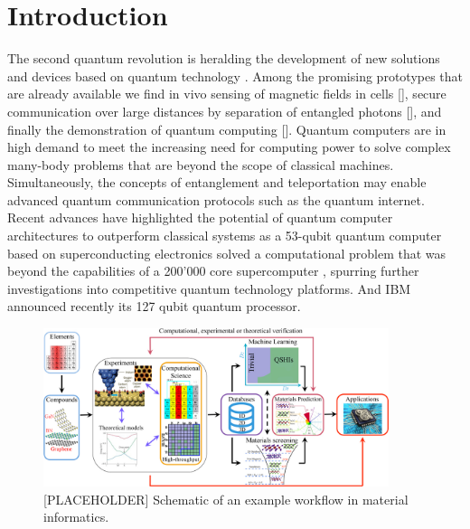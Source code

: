 \documentclass[superscriptaddress,unsortedaddress,
 amsmath,amssymb,
 aps,
]{revtex4-2}
\newcommand{\marianne}[1]{\textcolor{blue}{#1}}
\begin{document}
\section*{Introduction}%
The second quantum revolution is heralding the development of new solutions and devices based on quantum technology \cite{Acin2018}. Among the promising prototypes that are already available we find in vivo sensing of magnetic fields in cells [], secure communication over large distances by separation of entangled photons [], and finally the demonstration of quantum computing []. 
Quantum computers are in high demand to meet the increasing need for computing power to solve complex many-body problems that are beyond the scope of classical machines.   
Simultaneously, the concepts of entanglement and teleportation may enable advanced quantum communication protocols such as the quantum internet. 
Recent advances have highlighted the potential of quantum computer architectures to outperform classical systems as a 53-qubit quantum computer based on superconducting electronics solved a computational problem that was beyond the capabilities of a 200'000 core supercomputer \cite{Arute_2019}, spurring further investigations into competitive quantum technology platforms.  And IBM announced recently its 127 qubit quantum processor.

\begin{figure}[t]
    \centering
    \includegraphics[width=0.9\textwidth]{figures/ht-workflow.jpg}
    \caption{[PLACEHOLDER] Schematic of an example workflow in material informatics. 
    }
    \label{fig:paradigm}
\end{figure}
\end{document}

